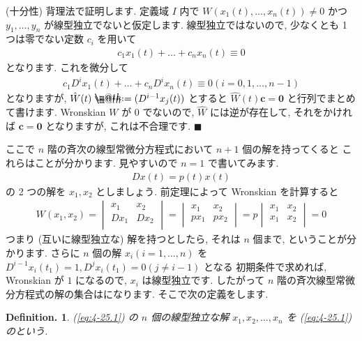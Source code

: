 \documentclass[openany, a4paper, oneside]{jsbook}
\makeatletter
\newcommand*{\defeq}{\mathrel{\rlap{%
\raisebox{0.3ex}{$\m@th\cdot$}}%
\raisebox{-0.3ex}{$\m@th\cdot$}}%
=}
\theoremstyle{break}
\theoremstyle{breakdefn}
\newtheorem{defn}[thm]{Definition.}
\makeatother
\begin{document}
(十分性)
背理法で証明します.
定義域 $I$ 内で $W ( x_1 (t) , \dots ,x_n (t)) \not= 0$ かつ $y_1, \dots , y_n$ が線型独立でないと仮定します.
線型独立ではないので, 少なくとも 1 つは零でない定数 $c_i$ を用いて
\begin{gather}
c_1 x_1 (t) + \dots + c_n x_n (t) \equiv 0
\end{gather}
となります.
これを微分して
\begin{gather}
c_1 D^i x_1 (t) + \dots + c_n D^i x_n (t) \equiv 0
( i = 0, 1, \dots , n-1)
\end{gather}
となりますが,  $\hat{W}(t) \defeq ( D^{i-1} x_j (t) )$ とすると
$\hat{W}(t) \bm{c} = \bm{0}$ と行列でまとめて書けます.
Wronskian $W$ が $0$ でないので,  $\hat{W}$ には逆が存在して, それをかければ $\bm{c} = \bm{0}$ となりますが,
これは不合理です.  $\blacksquare$

ここで $n$ 階の斉次の線型常微分方程式において $n+1$ 個の解を持ってくると
これらはことが分かります.
見やすいので $n=1$ で書いてみます.
\begin{gather}
D x (t) = p (t) x (t)
\end{gather}
の 2 つの解を $x_1 , x_2$ としましょう.
前定理によって Wronskian を計算すると
\begin{gather}
W (x_1,x_2)
=
\begin{vmatrix}
x_1 & x_2 \\
Dx_1 & D x_2 \\
\end{vmatrix}
=
\begin{vmatrix}
x_1 & x_2 \\
p x_1 & p x_2 \\
\end{vmatrix}
=
p
\begin{vmatrix}
x_1 & x_2 \\
x_1 & x_2 \\
\end{vmatrix}
=
0
\end{gather}
つまり (互いに線型独立な) 解を持つとしたら, それは $n$ 個まで, ということが分かります.
さらに $n$ 個の解 $x_i (i=1,\dots,n)$ を $D^{i-1}x_i (t_1)=1 ,D^{j}x_i (t_1)=0 (j\not= i-1)$ となる
初期条件で求めれば, Wronskian が $1$ になるので,  $x_i$ は線型独立です.
したがって $n$ 階の斉次線型常微分方程式の解の集合はになります.
そこで次の定義をします.
\begin{defn}
(\ref{eq:4-25.1}) の $n$ 個の線型独立な解 $x_1, x_2 , \dots , x_n$ を
(\ref{eq:4-25.1}) のという.
\end{defn}
\end{document}
